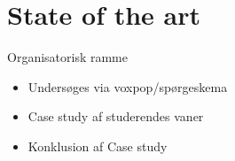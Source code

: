 \section{State of the art}
\begin{frame}{Organisatorisk ramme}{}
\begin{itemize}
\item Undersøges via voxpop/spørgeskema
\item Case study af studerendes vaner
\item Konklusion af Case study
\end{itemize}
\end{frame}